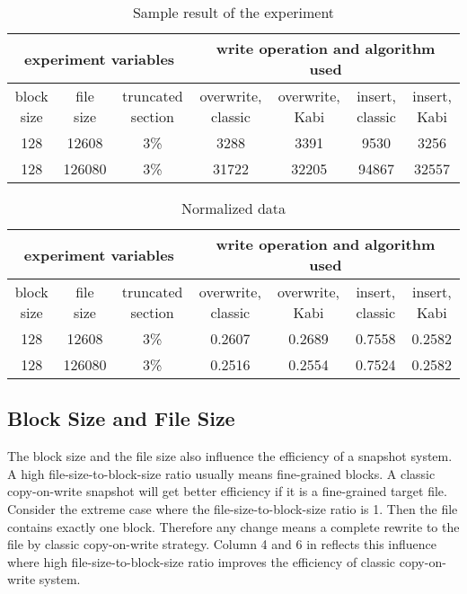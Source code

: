\begin{lscape} 
\begin{table}[t]
\caption{Sample result of the experiment}
\label{tab:sample_result}
\begin{center}
\begin{tabular}{|c|c|c|c|c|c|c|}
\hline
\multicolumn{3}{|c|}{experiment variables} & \multicolumn{4}{c|}{write operation and algorithm used} \\
\hline
block size & file size & truncated section & overwrite, classic & overwrite, Kabi & insert, classic & insert, Kabi\\
\hline
128 & 12608 & 3\% & 3288 & 3391 & 9530 & 3256 \\
\hline
128 & 126080 & 3\% & 31722 & 32205 & 94867 & 32557 \\
\hline
\end{tabular}
\end{center}
\end{table}

\begin{table}[t]
\caption{Normalized data}
\label{tab:norm}
\begin{center}
\begin{tabular}{|c|c|c|c|c|c|c|}
\hline
\multicolumn{3}{|c|}{experiment variables} & \multicolumn{4}{c|}{write operation and algorithm used} \\
\hline
block size & file size & truncated section & overwrite, classic & overwrite, Kabi & insert, classic & insert, Kabi\\
\hline
128 & 12608 & 3\% & 0.2607 & 0.2689 & 0.7558 & 0.2582 \\
\hline
128 & 126080 & 3\% & 0.2516 & 0.2554 & 0.7524 & 0.2582 \\
\hline
\end{tabular}
\end{center}
\end{table}
\end{lscape}

\subsection{Block Size and File Size}

    The block size and the file size also influence the efficiency of a snapshot system. A high file-size-to-block-size ratio usually means fine-grained blocks. A classic copy-on-write snapshot will get better efficiency if it is a fine-grained target file. Consider the extreme case where the file-size-to-block-size ratio is 1. Then the file contains exactly one block. Therefore any change means a complete rewrite to the file by classic copy-on-write strategy. Column 4 and 6 in  reflects this influence where high file-size-to-block-size ratio improves the efficiency of classic copy-on-write system.

